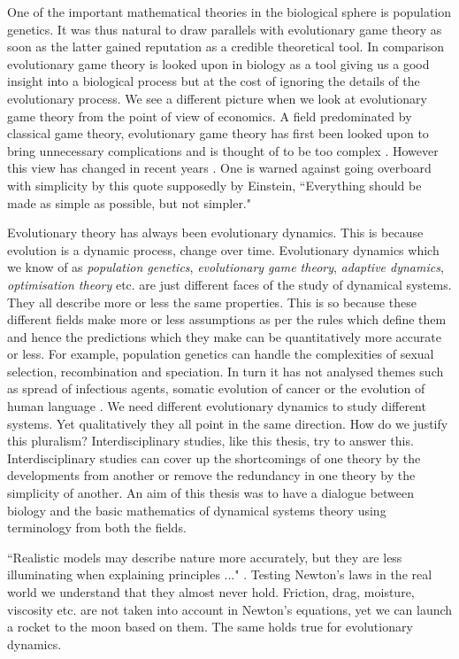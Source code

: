 \documentclass[oneside,11pt,a4paper]{book}
\begin{document}
One of the important mathematical theories in the biological sphere is population genetics.
It was thus natural to draw parallels with evolutionary game theory as soon as the latter gained reputation \citep{rowe:1987aa,rowe:1988aa,cressman:2003aa} as a credible theoretical tool.
In comparison evolutionary game theory is looked upon in biology as a tool giving us a good insight into a biological process but at the cost of ignoring the details of the evolutionary process.
We see a different picture when we look at evolutionary game theory from the point of view of economics.
A field predominated by classical game theory, evolutionary game theory has first been looked upon to bring unnecessary complications and is thought of to be too complex \citep{friedman:1991bv}.
However this view has changed in  recent years \citep{hammerstein:2005aa,sandholm:2010bo}.
One is warned against going overboard with simplicity by this quote supposedly by Einstein, ``Everything should be made as simple as possible, but not simpler."

Evolutionary theory has always been evolutionary dynamics.
This is because evolution is a dynamic process, change over time.
Evolutionary dynamics which we know of as \textit{population genetics}, \textit{evolutionary game theory}, \textit{adaptive dynamics}, \textit{optimisation theory} etc. are just different faces of the study of dynamical systems.
They all describe more or less the same properties.
This is so because these different fields make more or less assumptions as per the rules which define them and hence the predictions which they make can be quantitatively more accurate or less.
For example, population genetics can handle the complexities of sexual selection, recombination and speciation.
In turn it has not analysed themes such as spread of infectious agents, somatic evolution of cancer or the evolution of human language \citep{nowak:2006bo}.
We need different evolutionary dynamics to study different systems.
Yet qualitatively they all point in the same direction.
How do we justify this pluralism? 
Interdisciplinary studies, like this thesis, try to answer this.
Interdisciplinary studies can cover up the shortcomings of one theory by the developments from another or remove the redundancy in one theory by the simplicity of another.
An aim of this thesis was to have a dialogue between biology and the basic mathematics of dynamical systems theory using terminology from both the fields. 

``Realistic models may describe nature more accurately, but they are less illuminating when explaining principles ..." \citep{hartl:1997bo}.
Testing Newton's laws in the real world we understand that they almost never hold.
Friction, drag, moisture, viscosity etc. are not taken into account in Newton's equations, yet we can launch a rocket to the moon based on them.
The same holds true for evolutionary dynamics.
\end{document}
